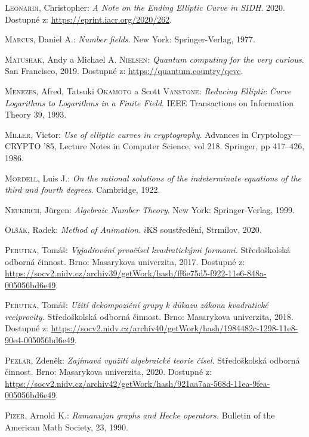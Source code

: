 \documentclass[12pt]{report}
\begin{document}
\begin{thebibliography}{97}
\textsc{Leonardi}, Christopher: \textit{A Note on the Ending Elliptic Curve in SIDH}. 2020. Dostupné z: \url{https://eprint.iacr.org/2020/262}.

\textsc{Marcus}, Daniel A.: \textit{Number fields}. New York: Springer-Verlag, 1977.

\textsc{Matushak}, Andy a Michael A. \textsc{Nielsen}: \textit{Quantum computing for the very curious}. San Francisco, 2019. Dostupné z: \url{https://quantum.country/qcvc}.

\textsc{Menezes}, Afred, Tatsuki \textsc{Okamoto} a Scott \textsc{Vanstone}: \textit{Reducing Elliptic Curve Logarithms to Logarithms in a Finite Field}. IEEE Transactions on Information Theory 39, 1993.

\textsc{Miller}, Victor: \textit{Use of elliptic curves in cryptography}. Advances in Cryptology—CRYPTO ’85, Lecture Notes in Computer Science, vol 218. Springer, pp 417–426, 1986.

\textsc{Mordell}, Luis J.: \textit{On the rational solutions of the indeterminate equations of the third and fourth degrees}. Cambridge, 1922.

\textsc{Neukirch}, J{\"u}rgen: \textit{Algebraic Number Theory}. New York: Springer-Verlag, 1999.

\textsc{Olšák}, Radek: \textit{Method of Animation}. $i$KS soustředění, Strmilov, 2020.

\textsc{Perutka}, Tomáš: \textit{Vyjadřování prvočísel kvadratickými formami.} Středoškolská odborná činnost. Brno: Masarykova univerzita, 2017. Dostupné z: \url{https://socv2.nidv.cz/archiv39/getWork/hash/ff6e75d5-f922-11e6-848a-005056bd6e49}.

\textsc{Perutka}, Tomáš: \textit{Užití dekompoziční grupy k důkazu zákona kvadratické reciprocity.} Středoškolská odborná činnost. Brno: Masarykova univerzita, 2018. Dostupné z: \url{https://socv2.nidv.cz/archiv40/getWork/hash/1984482c-1298-11e8-90e4-005056bd6e49}.


\textsc{Pezlar}, Zdeněk: \textit{Zajímavá využití algebraické teorie čísel}. Středoškolská odborná činnost. Brno: Masarykova univerzita, 2020. Dostupné z: \url{https://socv2.nidv.cz/archiv42/getWork/hash/921aa7aa-568d-11ea-9fea-005056bd6e49}.

\textsc{Pizer}, Arnold K.: \textit{Ramanujan graphs and Hecke operators.} Bulletin of the American Math Society, 23, 1990.


\end{thebibliography}
\end{document}
